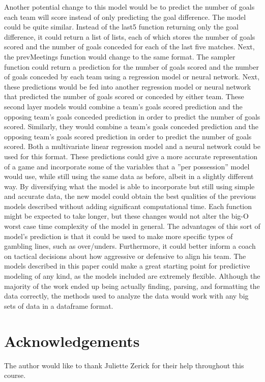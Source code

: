 \documentclass[sigconf]{acmart}
\begin{document}
Another potential change to this model would be to predict the number of goals each team will score instead of only predicting the goal difference. The model could be quite similar. Instead of the last5 function returning only the goal difference, it could return a list of lists, each of which stores the number of goals scored and the number of goals conceded for each of the last five matches. Next, the prevMeetings function would change to the same format. The sampler function could return a prediction for the number of goals scored and the number of goals conceded by each team using a regression model or neural network. Next, these predictions would be fed into another regression model or neural network that predicted the number of goals scored or conceded by either team. These second layer models would combine a team's goals scored prediction and the opposing team's goals conceded prediction in order to predict the number of goals scored. Similarly, they would combine a team's goals conceded prediction and the opposing team's goals scored prediction in order to predict the number of goals scored. Both a multivariate linear regression model and a neural network could be used for this format. These predictions could give a more accurate representation of a game and incorporate some of the variables that a ''per possession'' model would use, while still using the same data as before, albeit in a slightly different way. By diversifying what the model is able to incorporate but still using simple and accurate data, the new model could obtain the best qualities of the previous models described without adding significant computational time. Each function might be expected to take longer, but these changes would not alter the big-O worst case time complexity of the model in general. The advantages of this sort of model's prediction is that it could be used to make more specific types of gambling lines, such as over/unders. Furthermore, it could better inform a coach on tactical decisions about how aggressive or defensive to align his team.
The models described in this paper could make a great starting point for predictive modeling of any kind, as the models included are extremely flexible. Although the majority of the work ended up being actually finding, parsing, and formatting the data correctly, the methods used to analyze the data would work with any big sets of data in a dataframe format.

\section{Acknowledgements}
The author would like to thank Juliette Zerick for their help throughout this course.



\end{document}
